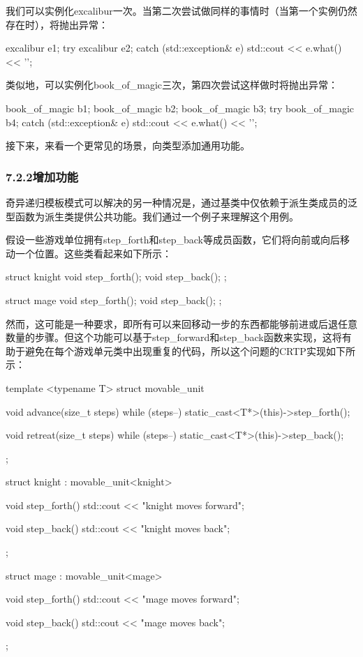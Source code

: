 我们可以实例化excalibur一次。当第二次尝试做同样的事情时（当第一个实例仍然存在时），将抛出异常：

\begin{cpp}
excalibur e1;
try
{
	excalibur e2;
}
catch (std::exception& e)
{
	std::cout << e.what() << '\n';
}
\end{cpp}

类似地，可以实例化book\_of\_magic三次，第四次尝试这样做时将抛出异常：

\begin{cpp}
book_of_magic b1;
book_of_magic b2;
book_of_magic b3;
try
{
	book_of_magic b4;
}
catch (std::exception& e)
{
	std::cout << e.what() << '\n';
}
\end{cpp}

接下来，来看一个更常见的场景，向类型添加通用功能。

\subsubsection{7.2.2\hspace{0.2cm}增加功能}

奇异递归模板模式可以解决的另一种情况是，通过基类中仅依赖于派生类成员的泛型函数为派生类提供公共功能。我们通过一个例子来理解这个用例。

假设一些游戏单位拥有step\_forth和step\_back等成员函数，它们将向前或向后移动一个位置。这些类看起来如下所示：

\begin{cpp}
struct knight
{
	void step_forth();
	void step_back();
};

struct mage
{
	void step_forth();
	void step_back();
};
\end{cpp}

然而，这可能是一种要求，即所有可以来回移动一步的东西都能够前进或后退任意数量的步骤。但这个功能可以基于step\_forward和step\_back函数来实现，这将有助于避免在每个游戏单元类中出现重复的代码，所以这个问题的CRTP实现如下所示：

\begin{cpp}
template <typename T>
struct movable_unit
{
	void advance(size_t steps)
	{
		while (steps--)
			static_cast<T*>(this)->step_forth();
	}

	void retreat(size_t steps)
	{
		while (steps--)
			static_cast<T*>(this)->step_back();
	}
};

struct knight : movable_unit<knight>
{
	void step_forth()
	{ std::cout << "knight moves forward\n"; }
	
	void step_back()
	{ std::cout << "knight moves back\n"; }
};

struct mage : movable_unit<mage>
{
	void step_forth()
	{ std::cout << "mage moves forward\n"; }
	
	void step_back()
	{ std::cout << "mage moves back\n"; }
};
\end{cpp}

